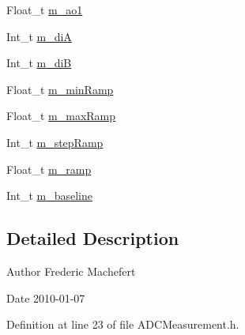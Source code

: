 \begin{DoxyCompactItemize}
Float\_\-t \hyperlink{classADCMeasurement_a149349cc87061e2604b9e021aa63ee8c}{m\_\-ao1}
\item 
Int\_\-t \hyperlink{classADCMeasurement_ae024ec8553b7ea765af8668ab5e95699}{m\_\-diA}
\item 
Int\_\-t \hyperlink{classADCMeasurement_a9d04a602dda58b9fd65acf4a0a7de9a3}{m\_\-diB}
\item 
Float\_\-t \hyperlink{classADCMeasurement_ab015017d6a05ac4711836ceb1e072a85}{m\_\-minRamp}
\item 
Float\_\-t \hyperlink{classADCMeasurement_a5e1f799c05f5781004a9081c4064e4a8}{m\_\-maxRamp}
\item 
Int\_\-t \hyperlink{classADCMeasurement_aa73b7cbd45e13df16291ff740f6140fe}{m\_\-stepRamp}
\item 
Float\_\-t \hyperlink{classADCMeasurement_ac84ed2ba70f38e73ec0eec1de65bbdca}{m\_\-ramp}
\item 
Int\_\-t \hyperlink{classADCMeasurement_aba7433a9e637389cc5425d036867a08f}{m\_\-baseline}
\end{DoxyCompactItemize}


\subsection{Detailed Description}
\begin{DoxyAuthor}{Author}
Frederic Machefert 
\end{DoxyAuthor}
\begin{DoxyDate}{Date}
2010-\/01-\/07 
\end{DoxyDate}


Definition at line 23 of file ADCMeasurement.h.


